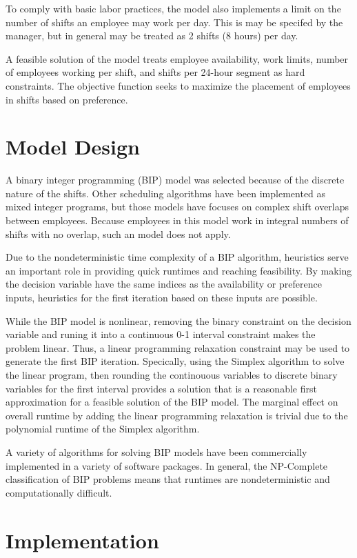 To comply with basic labor practices, the model also implements a limit on the number of shifts an employee may work per day. This is may be specifed by the manager, but in general may be treated as 2 shifts (8 hours) per day. 

A feasible solution of the model treats employee availability, work limits, number of employees working per shift, and shifts per 24-hour segment as hard constraints. The objective function seeks to maximize the placement of employees in shifts based on preference.

\section{Model Design}

A binary integer programming (BIP) model was selected because of the discrete nature of the shifts. Other scheduling algorithms have been implemented as mixed integer programs, but those models have focuses on complex shift overlaps between employees. Because employees in this model work in integral numbers of shifts with no overlap, such an model does not apply.

Due to the nondeterministic time complexity of a BIP algorithm, heuristics serve an important role in providing quick runtimes and reaching feasibility. By making the decision variable have the same indices as the availability or preference inputs, heuristics for the first iteration based on these inputs are possible. 

While the BIP model is nonlinear, removing the binary constraint on the decision variable and runing it into a continuous 0-1 interval constraint makes the problem linear. Thus, a linear programming relaxation constraint may be used to generate the first BIP iteration. Specically, using the Simplex algorithm to solve the linear program, then rounding the continouous variables to discrete binary variables for the first interval provides a solution that is a reasonable first approximation for a feasible solution of the BIP model. The marginal effect on overall runtime by adding the linear programming relaxation is trivial due to the polynomial runtime of the Simplex algorithm.  

A variety of algorithms for solving BIP models have been commercially implemented in a variety of software packages. In general, the NP-Complete classification of BIP problems means that runtimes are nondeterministic and computationally difficult.

\section{Implementation}


